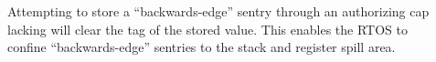\begin{description}
\begin{description}
    \item[] Attempting to store a ``backwards-edge'' sentry through an authorizing cap lacking \cappermSLC will clear the tag of the stored value.
    This enables the RTOS to confine ``backwards-edge'' sentries to the stack and register spill area.
  \end{description}
\end{description}

